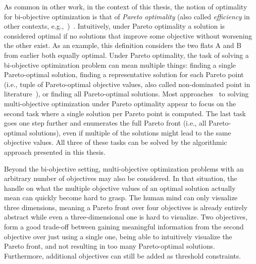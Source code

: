 As common in other work, in the context of this thesis, the notion of optimality for bi-objective optimization is that of \emph{Pareto optimality} (also called \emph{efficiency} in other contexts, e.g.,~\autocite{DBLP:journals/siamjo/SantisENR20})~\autocite{Ehrgott2005-2}.
Intuitively, under Pareto optimality a solution is considered optimal if no solutions that improve some objective without worsening the other exist.
As an example, this definition considers the two flats A and B from earlier both equally optimal.
Under Pareto optimality, the task of solving a bi-objective optimization problem can mean multiple things:
finding a single Pareto-optimal solution, finding a representative solution for each Pareto point (i.e., tuple of Pareto-optimal objective values, also called non-dominated point in literature~\autocite{Ehrgott2005-2}), or finding all Pareto-optimal solutions.
Most approaches~\autocite{DBLP:conf/cp/SohBTB17,DBLP:conf/cp/JanotaMSM21,DBLP:conf/ijcai/Terra-NevesLM18a} to solving multi-objective optimization under Pareto optimality appear to focus on the second task where a single solution per Pareto point is computed.
The last task goes one step further and enumerates the full Pareto front (i.e., all Pareto-optimal solutions), even if multiple of the solutions might lead to the same objective values.
All three of these tasks can be solved by the algorithmic approach presented in this thesis.

Beyond the bi-objective setting, multi-objective optimization problems with an arbitrary number of objectives may also be considered.
In that situation, the handle on what the multiple objective values of an optimal solution actually mean can quickly become hard to grasp.
The human mind can only visualize three dimensions, meaning a Pareto front over four objectives is already entirely abstract while even a three-dimensional one is hard to visualize.
Two objectives, form a good trade-off between gaining meaningful information from the second objective over just using a single one, being able to intuitively visualize the Pareto front, and not resulting in too many Pareto-optimal solutions.
Furthermore, additional objectives can still be added as threshold constraints.

